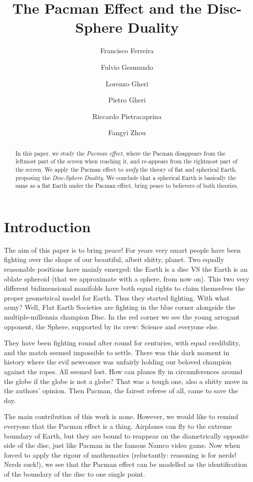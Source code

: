 \documentclass{article}
\title{The Pacman Effect and the Disc-Sphere Duality}
\author{Francisco Ferreira
\and Fulvio Gesmundo \and Lorenzo Gheri \and Pietro Gheri \and  Riccardo Pietracaprina \and Fangyi Zhou }
\date{}
\begin{document}
\maketitle
\begin{abstract}
  In this paper, we study the \emph{Pacman effect}, where the Pacman disappears
  from the leftmost part of the screen when reaching it, and re-appears from
  the rightmost part of the screen.
  We apply the Pacman effect to \emph{unify} the theory of flat and spherical
  Earth, proposing the \emph{Disc-Sphere Duality}.
  We conclude that a spherical Earth is basically the same as a flat Earth
  under the Pacman effect, bring peace to believers of both theories.
\end{abstract}

\section{Introduction}

The aim of this paper is to bring peace! For years very smart people have been
fighting over the shape of our beautiful, albeit shitty, planet. Two equally
reasonable positions have mainly emerged: the Earth is a disc VS the Earth is
an oblate spheroid (that we approximate with a sphere, from now on).
This two very different bidimensional manifolds have both equal rights
to claim themselves the proper geometrical model for Earth. Thus they started
fighting. With what army? Well, Flat Earth Societies are fighting in the blue
corner alongside the multiple-millennia champion Disc. In the red corner we see
the young arrogant opponent, the Sphere, supported by its crew: Science and
everyone else.

They have been fighting round after round for centuries, with equal
credibility, and the match seemed impossible to settle. There was this dark
moment in history where the evil newcomer was unfairly holding our beloved
champion against the ropes. All seemed lost. How can planes fly in
circumferences around the globe if the globe is not a globe? That was a tough
one, also a shitty move in the authors' opinion. Then Pacman, the fairest
referee of all, came to save the day.

The main contribution of this work is none. However, we would like to remind
everyone that the Pacman effect is a thing. Airplanes can fly to the extreme
boundary of Earth, but they are bound to reappear on the diametrically opposite
side of the disc, just like Pacman in the famous Namco video game. Now when
forced to apply the rigour of mathematics (reluctantly: reasoning is for nerds!
Nerds suck!), we see that the Pacman effect can be modelled as the
identification of the boundary of the disc to one single point.
\end{document}
